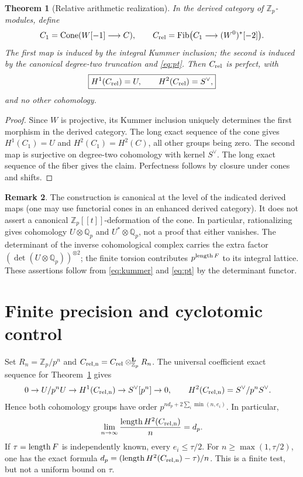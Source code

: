 \documentclass[11pt,a4paper]{article}
\newtheorem{theorem}{Theorem}[section]\newtheorem{proposition}[theorem]{Proposition}\newtheorem{corollary}[theorem]{Corollary}\theoremstyle{definition}\newtheorem{definition}[theorem]{Definition}\newtheorem{remark}[theorem]{Remark}
\newcommand{\Zp}{\mathbb Z_p}\newcommand{\Qp}{\mathbb Q_p}\newcommand{\Q}{\mathbb Q}\newcommand{\Sha}{\mathop{\mathrm{\mathit{\mathstrut Ш}}}} %
\renewcommand{\Sha}{\operatorname{Sha}}
\begin{document}
\begin{theorem}[Relative arithmetic realization]\label{thm:relative}
In the derived category of $\Zp$-modules, define
\begin{equation}\label{eq:cone}
C_1=\operatorname{Cone}(W[-1]\longrightarrow C),\qquad
C_{\rm rel}=\operatorname{Fib}\bigl(C_1\longrightarrow (W^0)^*[-2]\bigr).
\end{equation}
The first map is induced by the integral Kummer inclusion; the second is induced by the canonical degree-two truncation and \eqref{eq:pt}. Then $C_{\rm rel}$ is perfect, with
\[
\boxed{H^1(C_{\rm rel})=U,\qquad H^2(C_{\rm rel})=S^\vee,}
\]
and no other cohomology.
\end{theorem}
\begin{proof}
Since $W$ is projective, its Kummer inclusion uniquely determines the first morphism in the derived category. The long exact sequence of the cone gives $H^1(C_1)=U$ and $H^2(C_1)=H^2(C)$, all other groups being zero. The second map is surjective on degree-two cohomology with kernel $S^\vee$. The long exact sequence of the fiber gives the claim. Perfectness follows by closure under cones and shifts.
\end{proof}
\begin{remark}
The construction is canonical at the level of the indicated derived maps (one may use functorial cones in an enhanced derived category). It does not assert a canonical $\Zp[[t]]$-deformation of the cone. In particular, rationalizing gives cohomology $U\otimes\Qp$ and $U^*\otimes\Qp$, not a proof that either vanishes. The determinant of the inverse cohomological complex carries the extra factor $(\det(U\otimes\Qp))^{\otimes2}$; the finite torsion contributes $p^{\operatorname{length} F}$ to its integral lattice. These assertions follow from \eqref{eq:kummer} and \eqref{eq:pt} by the determinant functor.
\end{remark}
\newpage
\section{Finite precision and cyclotomic control}
Set $R_n=\Zp/p^n$ and $C_{\rm rel,n}=C_{\rm rel}\otimes^{\mathbf L}_{\Zp}R_n$. The universal coefficient exact sequence for Theorem~\ref{thm:relative} gives
\begin{align}
0\to U/p^n U\to H^1(C_{\rm rel,n})\to S^\vee[p^n]\to0,\qquad
H^2(C_{\rm rel,n})&=S^\vee/p^nS^\vee.\label{eq:finite}
\end{align}
Hence both cohomology groups have order $p^{nd_p+2\sum_i\min(n,e_i)}$. In particular,
\begin{equation}\label{eq:depth}
\lim_{n\to\infty}\frac{\operatorname{length} H^2(C_{\rm rel,n})}{n}=d_p.
\end{equation}
If $\tau=\operatorname{length} F$ is independently known, every $e_i\leq\tau/2$. For $n\geq\max(1,\tau/2)$, one has the exact formula $d_p=(\operatorname{length} H^2(C_{\rm rel,n})-\tau)/n$. This is a finite test, but not a uniform bound on $\tau$.
\end{document}
